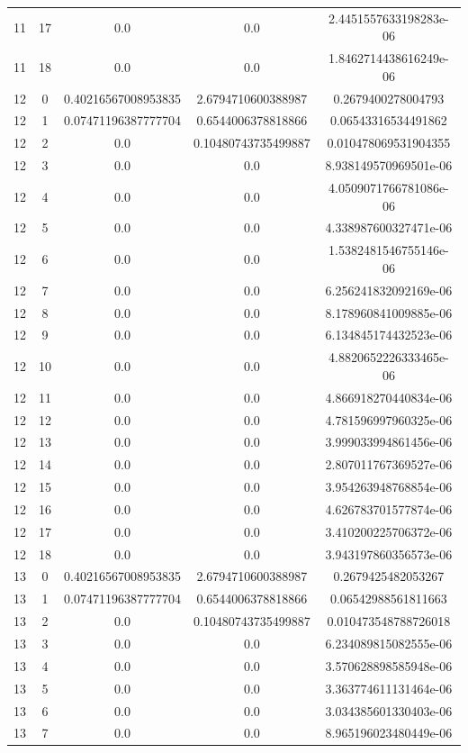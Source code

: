 \documentclass{article}
\begin{document}
\begin{table}[h]
\begin{tabular}{|c|c|c|c|c|}
11 & 17 & 0.0 & 0.0 & 2.4451557633198283e-06 \\
11 & 18 & 0.0 & 0.0 & 1.8462714438616249e-06 \\
12 & 0 & 0.40216567008953835 & 2.6794710600388987 & 0.2679400278004793 \\
12 & 1 & 0.07471196387777704 & 0.6544006378818866 & 0.06543316534491862 \\
12 & 2 & 0.0 & 0.10480743735499887 & 0.010478069531904355 \\
12 & 3 & 0.0 & 0.0 & 8.938149570969501e-06 \\
12 & 4 & 0.0 & 0.0 & 4.0509071766781086e-06 \\
12 & 5 & 0.0 & 0.0 & 4.338987600327471e-06 \\
12 & 6 & 0.0 & 0.0 & 1.5382481546755146e-06 \\
12 & 7 & 0.0 & 0.0 & 6.256241832092169e-06 \\
12 & 8 & 0.0 & 0.0 & 8.178960841009885e-06 \\
12 & 9 & 0.0 & 0.0 & 6.134845174432523e-06 \\
12 & 10 & 0.0 & 0.0 & 4.8820652226333465e-06 \\
12 & 11 & 0.0 & 0.0 & 4.866918270440834e-06 \\
12 & 12 & 0.0 & 0.0 & 4.781596997960325e-06 \\
12 & 13 & 0.0 & 0.0 & 3.999033994861456e-06 \\
12 & 14 & 0.0 & 0.0 & 2.807011767369527e-06 \\
12 & 15 & 0.0 & 0.0 & 3.954263948768854e-06 \\
12 & 16 & 0.0 & 0.0 & 4.626783701577874e-06 \\
12 & 17 & 0.0 & 0.0 & 3.410200225706372e-06 \\
12 & 18 & 0.0 & 0.0 & 3.943197860356573e-06 \\
13 & 0 & 0.40216567008953835 & 2.6794710600388987 & 0.2679425482053267 \\
13 & 1 & 0.07471196387777704 & 0.6544006378818866 & 0.06542988561811663 \\
13 & 2 & 0.0 & 0.10480743735499887 & 0.010473548788726018 \\
13 & 3 & 0.0 & 0.0 & 6.234089815082555e-06 \\
13 & 4 & 0.0 & 0.0 & 3.570628898585948e-06 \\
13 & 5 & 0.0 & 0.0 & 3.363774611131464e-06 \\
13 & 6 & 0.0 & 0.0 & 3.034385601330403e-06 \\
13 & 7 & 0.0 & 0.0 & 8.965196023480449e-06 \\

\end{tabular}
\end{table}
\end{document}
